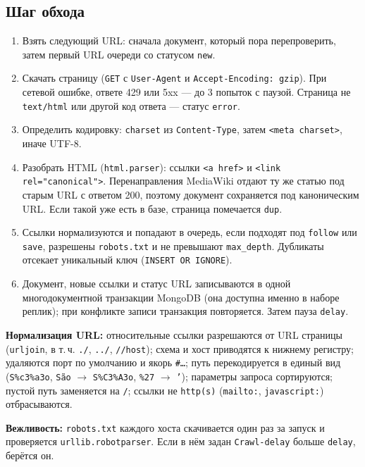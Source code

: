 \subsection{Шаг обхода}
\begin{enumerate}
    \item Взять следующий URL: сначала документ, который пора перепроверить, затем первый URL очереди со статусом \texttt{new}.
    \item Скачать страницу (\texttt{GET} с \texttt{User-Agent} и \texttt{Accept-Encoding: gzip}). При сетевой ошибке, ответе 429 или 5xx --- до 3 попыток с паузой. Страница не \texttt{text/html} или другой код ответа --- статус \texttt{error}.
    \item Определить кодировку: \texttt{charset} из \texttt{Content-Type}, затем \texttt{<meta charset>}, иначе UTF-8.
    \item Разобрать HTML (\texttt{html.parser}): ссылки \texttt{<a href>} и \texttt{<link rel="canonical">}. Перенаправления MediaWiki отдают ту же статью под старым URL с ответом 200, поэтому документ сохраняется под каноническим URL. Если такой уже есть в базе, страница помечается \texttt{dup}.
    \item Ссылки нормализуются и попадают в очередь, если подходят под \texttt{follow} или \texttt{save}, разрешены \texttt{robots.txt} и не превышают \texttt{max\_depth}. Дубликаты отсекает уникальный ключ (\texttt{INSERT OR IGNORE}).
    \item Документ, новые ссылки и статус URL записываются в одной многодокументной транзакции MongoDB (она доступна именно в наборе реплик); при конфликте записи транзакция повторяется. Затем пауза \texttt{delay}.
\end{enumerate}

\textbf{Нормализация URL:} относительные ссылки разрешаются от URL страницы (\texttt{urljoin}, в т.\,ч. \texttt{./}, \texttt{../}, \texttt{//host}); схема и хост приводятся к нижнему регистру; удаляются порт по умолчанию и якорь \texttt{\#\ldots}; путь перекодируется в единый вид (\texttt{S\%c3\%a3o}, \texttt{São} $\to$ \texttt{S\%C3\%A3o}, \texttt{\%27} $\to$ \texttt{'}); параметры запроса сортируются; пустой путь заменяется на \texttt{/}; ссылки не \texttt{http(s)} (\texttt{mailto:}, \texttt{javascript:}) отбрасываются.

\textbf{Вежливость:} \texttt{robots.txt} каждого хоста скачивается один раз за запуск и проверяется \texttt{urllib.robotparser}. Если в нём задан \texttt{Crawl-delay} больше \texttt{delay}, берётся он.


